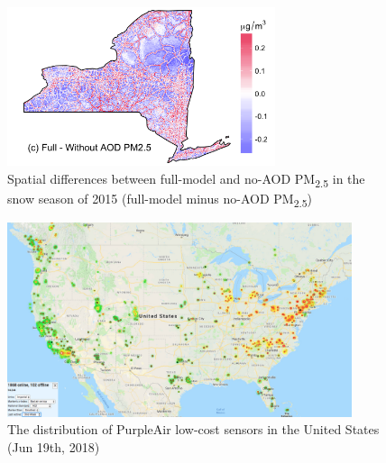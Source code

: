 \documentclass[11pt]{article}
\newcommand{\tsub}{\textsubscript}
\begin{document}
\begin{figure}[H]
    \centering
    \includegraphics[width=0.7\textwidth]{img/no_aod.png}
    \caption{Spatial differences between full-model and no-AOD PM\tsub{2.5} in the snow season of 2015 (full-model minus no-AOD PM\tsub{2.5})}
    \label{fig:noaod}
\end{figure}

\begin{figure}[H]
    \centering
    \includegraphics[width=0.9\textwidth]{img/purpleair.jpg}
    \caption{The distribution of PurpleAir low-cost sensors in the United States (Jun 19th, 2018)}
    \label{fig:pa}
\end{figure}

\newpage


\end{document}
